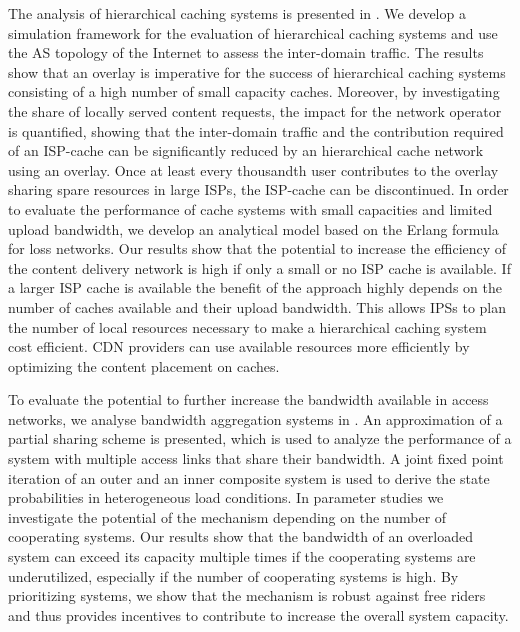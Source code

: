 The analysis of hierarchical caching systems is presented in .
We develop a simulation framework for the evaluation of hierarchical caching systems and use the AS topology of the Internet to assess the inter-domain traffic.
The results show that an overlay is imperative for the success of hierarchical caching systems consisting of a high number of small capacity caches.
Moreover, by investigating the share of locally served content requests, the impact for the network operator is quantified, showing that the inter-domain traffic and the contribution required of an ISP-cache can be significantly reduced by an hierarchical cache network using an overlay.
Once at least every thousandth user contributes to the overlay sharing spare resources in large ISPs, the ISP-cache can be discontinued.
In order to evaluate the performance of cache systems with small capacities and limited upload bandwidth, we develop an analytical model based on the Erlang formula for loss networks.
Our results show that the potential to increase the efficiency of the content delivery network is high if only a small or no ISP cache is available.
If a larger ISP cache is available the benefit of the approach highly depends on the number of caches available and their upload bandwidth.
This allows IPSs to plan the number of local resources necessary to make a hierarchical caching system cost efficient.
CDN providers can use available resources more efficiently by optimizing the content placement on caches.

To evaluate the potential to further increase the bandwidth available in access networks, we analyse bandwidth aggregation systems in .
An approximation of a partial sharing scheme is presented, which is used to analyze the performance of a system with multiple access links that share their bandwidth.
A joint fixed point iteration of an outer and an inner composite system is used to derive the state probabilities in heterogeneous load conditions.
In parameter studies we investigate the potential of the mechanism depending on the number of cooperating systems.
Our results show that the bandwidth of an overloaded system can exceed its capacity multiple times if the cooperating systems are underutilized, especially if the number of cooperating systems is high.
By prioritizing systems, we show that the mechanism is robust against free riders and thus provides incentives to contribute to increase the overall system capacity.

